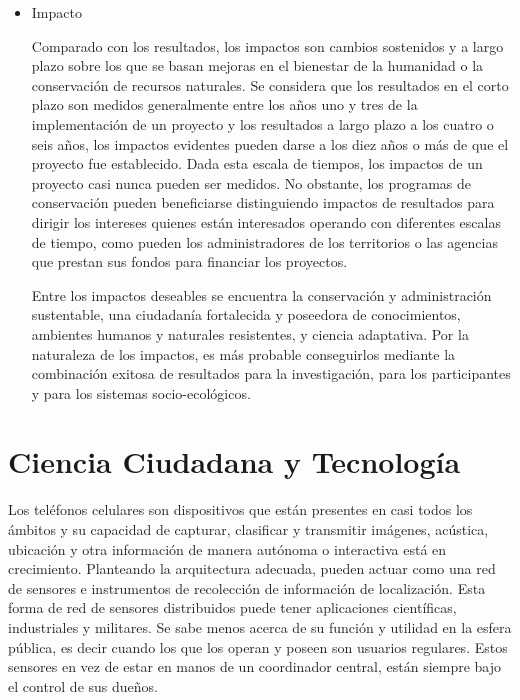 \begin{itemize}
	\item {Impacto}
	
	Comparado con los resultados, los impactos son cambios sostenidos y a largo plazo sobre los que se basan mejoras en el bienestar de la humanidad o la conservación de recursos naturales. Se considera que los resultados en el corto plazo son medidos generalmente entre los años uno y tres de la implementación de un proyecto y los resultados a largo plazo a los cuatro o seis años, los impactos evidentes pueden darse a los diez años o más de que el proyecto fue establecido. Dada esta escala de tiempos, los impactos de un proyecto casi nunca pueden ser medidos. No obstante, los programas de conservación pueden beneficiarse distinguiendo impactos de resultados para dirigir los intereses quienes están interesados operando con diferentes escalas de tiempo, como pueden los administradores de los territorios o las agencias que prestan sus fondos para financiar los proyectos.
	
	Entre los impactos deseables se encuentra la conservación y administración sustentable, una ciudadanía fortalecida y poseedora de conocimientos, ambientes humanos y naturales resistentes, y ciencia adaptativa. Por la naturaleza de los impactos, es más probable conseguirlos mediante la combinación exitosa de resultados para la investigación, para los participantes y para los sistemas socio-ecológicos.
		
\end{itemize}	

\cite{shirk2012public}


\section{Ciencia Ciudadana y Tecnología}

	Los teléfonos celulares son dispositivos que están presentes en casi todos los ámbitos y su capacidad de capturar, clasificar y transmitir imágenes, acústica, ubicación y otra información de manera autónoma o interactiva está en crecimiento.
Planteando la arquitectura adecuada, pueden actuar como una red de sensores e instrumentos de recolección de información de localización. 
Esta forma de red de sensores distribuidos puede tener aplicaciones científicas, industriales y militares. Se sabe menos acerca de su función y utilidad en la esfera pública, es decir cuando los que los operan y poseen son usuarios regulares.   Estos sensores en vez de estar en manos de un coordinador central, están siempre bajo el control de sus dueños.

